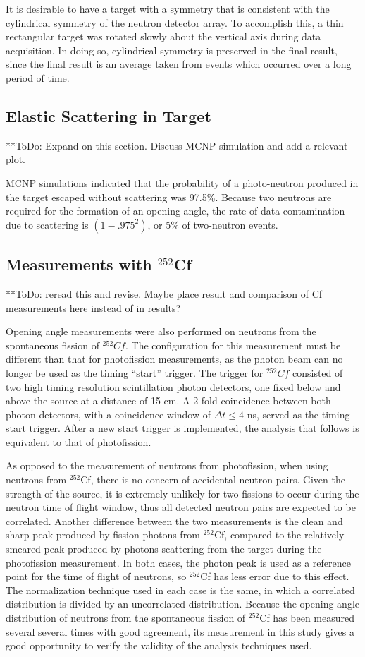 It is desirable to have a target with a symmetry that is consistent with the cylindrical symmetry of the neutron detector array. To accomplish this, a thin rectangular target was rotated slowly about the vertical axis during data acquisition. In doing so, cylindrical symmetry is preserved in the final result, since the final result is an average taken from events which occurred over a long period of time. 

\subsection{Elastic Scattering in Target}
**ToDo: Expand on this section. Discuss MCNP simulation and add a relevant plot. 

MCNP simulations indicated that the probability of a photo-neutron produced in the target escaped without scattering was 97.5\%. Because two neutrons are required for the formation of an opening angle, the rate of data contamination due to scattering is $(1-.975^2)$, or 5\% of two-neutron events.  


\subsection{Measurements with $^{252}$Cf}
**ToDo: reread this and revise. Maybe place result and comparison of Cf measurements here instead of in results?  

Opening angle measurements were also performed on neutrons from the spontaneous fission of $^{252}Cf$. The configuration for this measurement must be different than that for photofission measurements, as the photon beam can no longer be used as the timing ``start'' trigger. The trigger for $^{252}Cf$ consisted of two high timing resolution scintillation photon detectors, one fixed below and above the source at a distance of 15 cm. A 2-fold coincidence between both photon detectors, with a coincidence window of $\Delta t\leq 4$ ns, served as the timing start trigger. After a new start trigger is implemented, the analysis that follows is equivalent to that of photofission. 

As opposed to the measurement of neutrons from photofission, when using neutrons from $^{252}$Cf, there is no concern of accidental neutron pairs. Given the strength of the source, it is extremely unlikely for two fissions to occur during the neutron time of flight window, thus all detected neutron pairs are expected to be correlated. Another difference between the two measurements is the clean and sharp peak produced by fission photons from $^{252}$Cf, compared to the relatively smeared peak produced by photons scattering from the target during the photofission measurement. In both cases, the photon peak is used as a reference point for the time of flight of neutrons, so $^{252}$Cf has less error due to this effect. The normalization technique used in each case is the same, in which a correlated distribution is divided by an uncorrelated distribution. Because the opening angle distribution of neutrons from the spontaneous fission of $^{252}$Cf has been measured several several times with good agreement, its measurement in this study gives a good opportunity to verify the validity of the analysis techniques used.  
